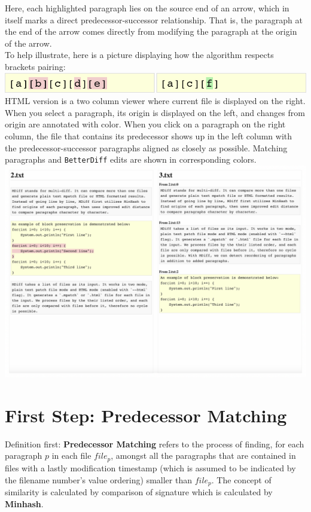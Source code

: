 \documentclass{article}
\begin{document}
Here, each highlighted paragraph lies on the source end of an arrow, which in itself marks a direct predecessor-successor relationship. That is, the paragraph at the end of the arrow comes directly from modifying the paragraph at the origin of the arrow.\\

To help illustrate, here is a picture displaying how the algorithm respects brackets pairing:\\
\includegraphics[center]{Screenshot1.png}\\

HTML version is a two column viewer where current file is displayed on the right. When you select a paragraph, its origin is displayed on the left, and changes from origin are annotated with color. When you click on a paragraph on the right column, the file that contains its predecessor shows up in the left column with the predecessor-successor paragraphs aligned as closely as possible. Matching paragraphs and \texttt{BetterDiff} edits are shown in corresponding colors. \\
\includegraphics[scale=0.4,center]{Screenshot.png}\\

\section{First Step: Predecessor Matching}
Definition first: \textbf{Predecessor Matching} refers to the process of finding, for each paragraph $p$ in each file $file_p$, amongst all the paragraphs that are contained in files with a lastly modification timestamp (which is assumed to be indicated by the filename number's value ordering) smaller than $file_p$. The concept of similarity is calculated by comparison of signature which is calculated by \textbf{Minhash}.
\end{document}
